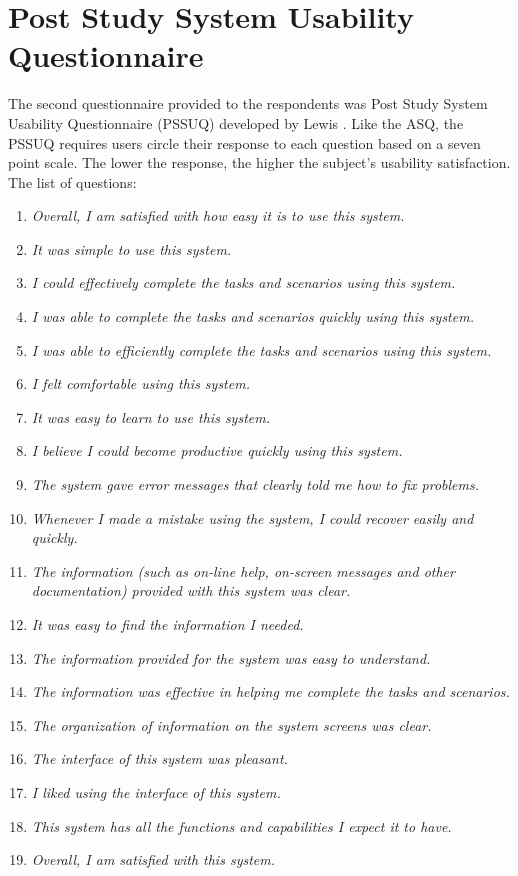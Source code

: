 \section{Post Study System Usability Questionnaire}
The second questionnaire provided to the respondents was Post Study System Usability Questionnaire (PSSUQ) developed by Lewis \cite{Lewis}. Like the ASQ, the PSSUQ requires users circle their response to each question based on a seven point scale. The lower the response, the higher the subject's usability satisfaction.
The list of questions:
\begin{enumerate}
	\item \textit{Overall, I am satisfied with how easy it is to use this system.}
	\item \textit{It was simple to use this system.}
	\item \textit{I could effectively complete the tasks and scenarios using this system.}
	\item \textit{I was able to complete the tasks and scenarios quickly using this system.}
	\item \textit{I was able to efficiently complete the tasks and scenarios using this system.}
	\item \textit{I felt comfortable using this system.}
	\item \textit{It was easy to learn to use this system.}
	\item \textit{I believe I could become productive quickly using this system.}
	\item \textit{The system gave error messages that clearly told me how to fix problems.}
	\item \textit{Whenever I made a mistake using the system, I could recover easily and quickly.}
	\item \textit{The information (such as on-line help, on-screen messages and other documentation) provided with this system was clear.}
	\item \textit{It was easy to find the information I needed.}
	\item \textit{The information provided for the system was easy to understand.}
	\item \textit{The information was effective in helping me complete the tasks and scenarios.}
	\item \textit{The organization of information on the system screens was clear.}
	\item \textit{The interface of this system was pleasant.}
	\item \textit{I liked using the interface of this system.}
	\item \textit{This system has all the functions and capabilities I expect it to have.}
	\item \textit{Overall, I am satisfied with this system.}
\end{enumerate}
